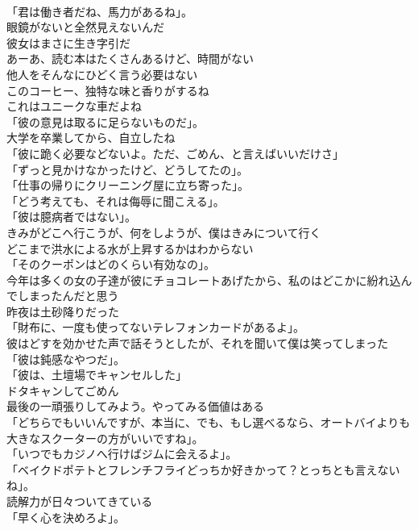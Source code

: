 \documentclass[8pt]{extreport}
\begin{document}
\begin{CJK}{UTF8}{min}
\\	「君は働き者だね、馬力があるね」。	
\\	眼鏡がないと全然見えないんだ	
\\	彼女はまさに生き字引だ	
\\	あーあ、読む本はたくさんあるけど、時間がない	
\\	他人をそんなにひどく言う必要はない	
\\	このコーヒー、独特な味と香りがするね	
\\	これはユニークな車だよね	
\\	「彼の意見は取るに足らないものだ」。	
\\	大学を卒業してから、自立したね	
\\	「彼に跪く必要などないよ。ただ、ごめん、と言えばいいだけさ」	
\\	「ずっと見かけなかったけど、どうしてたの」。	
\\	「仕事の帰りにクリーニング屋に立ち寄った」。	
\\	「どう考えても、それは侮辱に聞こえる」。	
\\	「彼は臆病者ではない」。	
\\	きみがどこへ行こうが、何をしようが、僕はきみについて行く	
\\	どこまで洪水による水が上昇するかはわからない	
\\	「そのクーポンはどのくらい有効なの」。	
\\	今年は多くの女の子達が彼にチョコレートあげたから、私のはどこかに紛れ込んでしまったんだと思う	
\\	昨夜は土砂降りだった	
\\	「財布に、一度も使ってないテレフォンカードがあるよ」。	
\\	彼はどすを効かせた声で話そうとしたが、それを聞いて僕は笑ってしまった	
\\	「彼は鈍感なやつだ」。	
\\	「彼は、土壇場でキャンセルした」	
\\	ドタキャンしてごめん	
\\	最後の一頑張りしてみよう。やってみる価値はある	
\\	「どちらでもいいんですが、本当に、でも、もし選べるなら、オートバイよりも大きなスクーターの方がいいですね」。	
\\	「いつでもカジノへ行けばジムに会えるよ」。	
\\	「ベイクドポテトとフレンチフライどっちか好きかって？とっちとも言えないね」。	
\\	読解力が日々ついてきている	
\\	「早く心を決めろよ」。	

\end{CJK}
\end{document}
